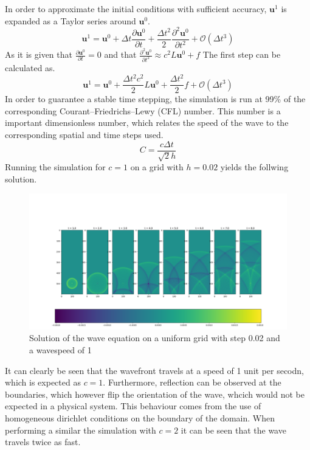 \documentclass{article}
\begin{document}
In order to approximate the initial conditions with sufficient accuracy, $\mathbf{u}^{1}$ is expanded as a Taylor series around $\mathbf{u}^{0}$.
\begin{equation}
\mathbf{u}^{1}=\mathbf{u}^{0}+\Delta t \frac{\partial \mathbf{u}^{0}}{\partial t} + \frac{\Delta t^2}{2} \frac{\partial^2 \mathbf{u}^{0}}{\partial t^2} + \mathcal{O}(\Delta t^3)
\end{equation}
As it is given that $\frac{\partial \mathbf{u}^{0}}{\partial t} = 0$ and that $\frac{\partial^2 \mathbf{u}^{0}}{\partial t^2} \approx c^2 L \mathbf{u}^0 + f$ The first step can be calculated as.
\begin{equation}
\mathbf{u}^{1}=\mathbf{u}^{0}+ \frac{\Delta t^2 c^2}{2} L \mathbf{u}^{0} + \frac{\Delta t^2 }{2} f+ \mathcal{O}(\Delta t^3) 
\end{equation}
In order to guarantee a stable time stepping, the simulation is run at 99\% of the corresponding Courant–Friedrichs–Lewy (CFL) number. This number is a important dimensionless number, which relates the speed of the wave to the corresponding spatial and time steps used.
\begin{equation}
C = \frac{c\Delta t}{\sqrt{2}h}
\end{equation}
Running the simulation for $c=1$ on a grid with $h=0.02$ yields the follwing solution.

\begin{figure}[H]
	\centering
	\includegraphics[width=.9\linewidth]{311.png}
	\caption{Solution of the wave equation on a uniform grid with step 0.02 and a wavespeed of 1}
	\label{fig:c1}
\end{figure}
It can clearly be seen that the wavefront travels at a speed of 1 unit per secodn, which is expected as $c=1$. Furthermore, reflection can be observed at the boundaries, which however flip the orientation of the wave, whcich would not be expected in a physical system. This behaviour comes from the use of homogeneous dirichlet conditions on the boundary of the domain. When performing a similar the simulation with $c=2$ it can be seen that the wave travels twice as fast.
\end{document}

